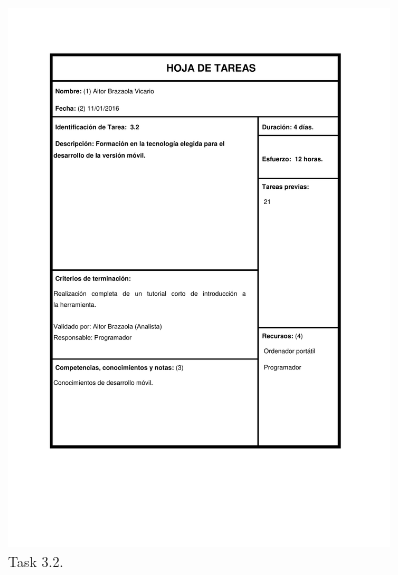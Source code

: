 \documentclass{DeustoFDP}
\begin{document}
\begin{figure}[H]
	\centering
	\includegraphics[width=0.9\textwidth]{fig/Tareas/32}
	\caption{Task 3.2.}
	\label{fig:t32}
\end{figure}
\end{document}
